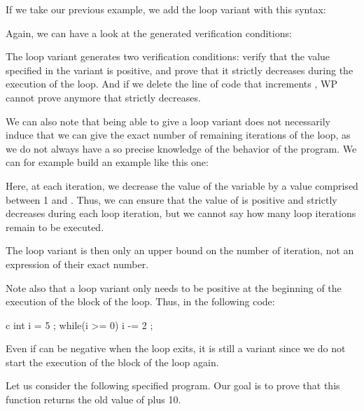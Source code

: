 If we take our previous example, we add the loop variant with this
syntax:






Again, we can have a look at the generated verification conditions:





The loop variant generates two verification conditions: verify that the value
specified in the variant is positive, and prove that it strictly
decreases during the execution of the loop. And if we delete the line of
code that increments , WP cannot prove anymore that
 strictly decreases.

We can also note that being able to give a loop variant does not
necessarily induce that we can give the exact number of remaining
iterations of the loop, as we do not always have a so precise knowledge
of the behavior of the program. We can for example build an example like
this one:






Here, at each iteration, we decrease the value of the variable
 by a value comprised between 1 and . Thus, we can
ensure that the value of  is positive and strictly decreases
during each loop iteration, but we cannot say how many loop iterations
remain to be executed.



The loop variant is then only an upper bound on the number of iteration,
not an expression of their exact number.


Note also that a loop variant only needs to be positive at the beginning
of the execution of the block of the loop. Thus, in the following code:


\begin{CodeBlock}{c}
int i = 5 ;
while(i >= 0){
  i -= 2 ;
}
\end{CodeBlock}

Even if  can be negative when the loop exits, it is still
a variant since we do not start the execution of the block of the loop
again.




Let us consider the following specified program. Our goal is to prove
that this function returns the old value of  plus 10.



